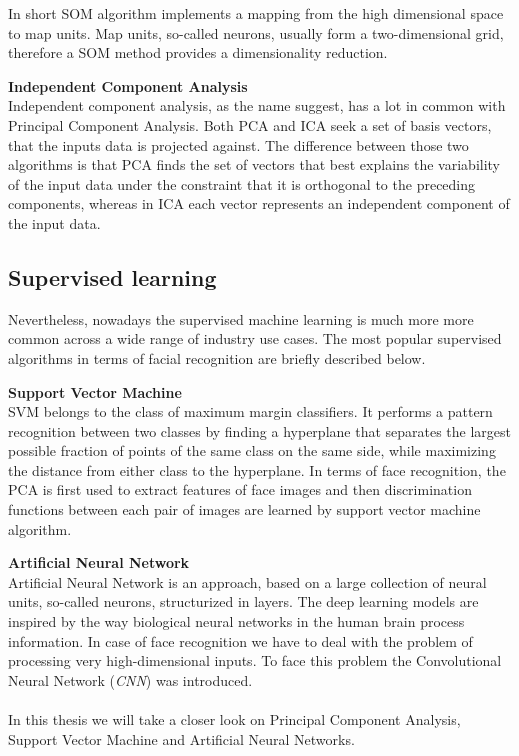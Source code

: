 In short SOM algorithm implements a mapping from the high dimensional space to map units. Map units, so-called neurons, usually form a two-dimensional grid, therefore a SOM method provides a dimensionality reduction.
\\
\par
\textbf{Independent Component Analysis}
\\
Independent component analysis, as the name suggest, has a lot in common with Principal Component Analysis. Both PCA and ICA seek a set of basis vectors, that the inputs data is projected against. The difference between those two algorithms is that PCA finds the set of vectors that best explains the variability of the input data under the constraint that it is orthogonal to the preceding components, whereas in ICA each vector represents an independent component of the input data. 

\subsection{Supervised learning}
 
Nevertheless, nowadays the supervised machine learning is much more more common across a wide range of industry use cases. The most popular supervised algorithms in terms of facial recognition are briefly described below.
\\
\par
\textbf{Support Vector Machine}
\\
SVM belongs to the class of maximum margin classifiers. It performs a pattern recognition between two classes by finding a hyperplane that separates the largest possible fraction of points of the same class on the same side, while maximizing the distance from either class to the hyperplane. In terms of face recognition, the PCA is first used to extract features of face images and then discrimination functions between each pair of images are learned by support vector machine algorithm. 
\\
\par
\textbf{Artificial Neural Network}
\\
Artificial Neural Network is an approach, based on a large collection of neural units, so-called neurons, structurized in layers. The deep learning models are inspired by the way biological neural networks in the human brain process information. In case of face recognition we have to deal with the problem of processing very high-dimensional inputs. To face this problem the Convolutional Neural Network (\textit{CNN}) was introduced. 
\\\\
In this thesis we will take a closer look on Principal Component Analysis, Support Vector Machine and Artificial Neural Networks.














